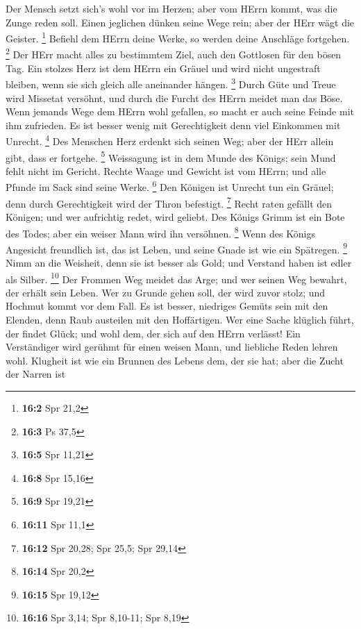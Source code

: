  Der Mensch setzt sich's wohl vor im Herzen; aber vom
HErrn kommt, was die Zunge reden soll.  Einen jeglichen
dünken seine Wege rein; aber der HErr wägt die Geister. \footnote{\textbf{16:2}
  Spr 21,2}  Befiehl dem HErrn deine Werke, so werden
deine Anschläge fortgehen. \footnote{\textbf{16:3} Ps 37,5}
 Der HErr macht alles zu bestimmtem Ziel, auch den
Gottlosen für den bösen Tag.  Ein stolzes Herz ist dem
HErrn ein Gräuel und wird nicht ungestraft bleiben, wenn sie sich gleich
alle aneinander hängen. \footnote{\textbf{16:5} Spr 11,21}
 Durch Güte und Treue wird Missetat versöhnt, und durch
die Furcht des HErrn meidet man das Böse.  Wenn jemands
Wege dem HErrn wohl gefallen, so macht er auch seine Feinde mit ihm
zufrieden.  Es ist besser wenig mit Gerechtigkeit denn
viel Einkommen mit Unrecht. \footnote{\textbf{16:8} Spr 15,16}
 Des Menschen Herz erdenkt sich seinen Weg; aber der HErr
allein gibt, dass er fortgehe. \footnote{\textbf{16:9} Spr 19,21}
 Weissagung ist in dem Munde des Königs; sein Mund fehlt
nicht im Gericht.  Rechte Waage und Gewicht ist vom
HErrn; und alle Pfunde im Sack sind seine Werke. \footnote{\textbf{16:11}
  Spr 11,1}  Den Königen ist Unrecht tun ein Gräuel; denn
durch Gerechtigkeit wird der Thron befestigt. \footnote{\textbf{16:12}
  Spr 20,28; Spr 25,5; Spr 29,14}  Recht raten gefällt
den Königen; und wer aufrichtig redet, wird geliebt.  Des
Königs Grimm ist ein Bote des Todes; aber ein weiser Mann wird ihn
versöhnen. \footnote{\textbf{16:14} Spr 20,2}  Wenn des
Königs Angesicht freundlich ist, das ist Leben, und seine Gnade ist wie
ein Spätregen. \footnote{\textbf{16:15} Spr 19,12}  Nimm
an die Weisheit, denn sie ist besser als Gold; und Verstand haben ist
edler als Silber. \footnote{\textbf{16:16} Spr 3,14; Spr 8,10-11; Spr
  8,19}  Der Frommen Weg meidet das Arge; und wer seinen
Weg bewahrt, der erhält sein Leben.  Wer zu Grunde gehen
soll, der wird zuvor stolz; und Hochmut kommt vor dem Fall.
 Es ist besser, niedriges Gemüts sein mit den Elenden,
denn Raub austeilen mit den Hoffärtigen.  Wer eine Sache
klüglich führt, der findet Glück; und wohl dem, der sich auf den HErrn
verlässt!  Ein Verständiger wird gerühmt für einen weisen
Mann, und liebliche Reden lehren wohl.  Klugheit ist wie
ein Brunnen des Lebens dem, der sie hat; aber die Zucht der Narren ist
